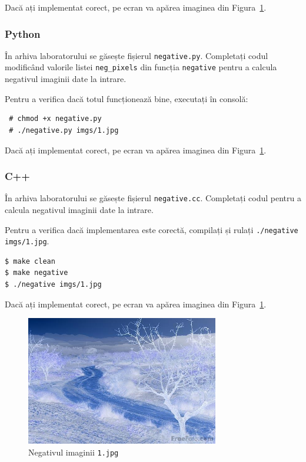 \documentclass[12pt]{article}%
\newcommand{\pyt}{{\color{cadmiumgreen} Python}}
\newcommand{\cc}{{\color{cobalt} C++}}
\begin{document}
Dacă ați implementat corect, pe ecran va apărea imaginea din
Figura~\ref{fig:neg}.

\subsubsection*{\pyt}
\label{sec:pyt1}

În arhiva laboratorului se găsește fișierul
\texttt{negative.py}. Completați codul modificând valorile listei
\texttt{neg\_pixels} din funcția \texttt{negative} pentru a calcula
negativul imaginii date la intrare.

Pentru a verifica dacă totul funcționează bine, executați în consolă:

\begin{verbatim}
 # chmod +x negative.py
 # ./negative.py imgs/1.jpg
\end{verbatim}

Dacă ați implementat corect, pe ecran va apărea imaginea din
Figura~\ref{fig:neg}.

\subsubsection*{\cc}

În arhiva laboratorului se găsește fișierul
\texttt{negative.cc}. Completați codul pentru a calcula negativul
imaginii date la intrare.

Pentru a verifica dacă implementarea este corectă, compilați și rulați
\texttt{./negative imgs/1.jpg}.

\begin{verbatim}
$ make clean
$ make negative
$ ./negative imgs/1.jpg
\end{verbatim}

Dacă ați implementat corect, pe ecran va apărea imaginea din
Figura~\ref{fig:neg}.

\begin{figure}[h]
  \centering
  \includegraphics[width=0.75\textwidth]{src/imgs/1_neg.jpg}
  \caption{Negativul imaginii \texttt{1.jpg}}
  \label{fig:neg}
\end{figure}
\end{document}
